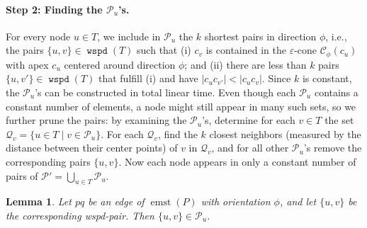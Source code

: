 \documentclass[11pt]{paper}
\newcommand {\eps} {\varepsilon}
\DeclareMathOperator {\wspd}{\texttt{wspd}}
\DeclareMathOperator {\emst}{emst}
\newtheorem {lem}[theorem] {Lemma}
\begin{document}
\paragraph{Step 2: Finding the $\mathcal{P}_u$'s.}
For every node $u \in T$, we include in $\mathcal{P}_u$ the $k$ shortest
pairs in direction $\phi$, i.e., the
pairs $\{u, v\} \in \wspd(T)$ such that
(i) $c_v$ is contained
in the $\eps$-cone $\mathcal{C}_\phi(c_u)$ with apex $c_u$
centered around direction $\phi$;
and (ii) there are less than $k$ pairs $\{u, v'\} \in \wspd(T)$
that fulfill (i) and have
$|c_uc_{v'}| < |c_uc_v|$.
Since $k$ is constant,
the $\mathcal{P}_u$'s can be constructed in total linear
time.
Even though each $\mathcal{P}_u$ contains a constant number of
elements, a node might still appear in many such sets, so
we further prune the pairs:
by examining the $\mathcal{P}_u$'s, determine for each $v \in T$ the
set $\mathcal{Q}_v = \{u \in T \mid v \in \mathcal{P}_u\}$.
For each $\mathcal{Q}_v$, find the $k$ closest neighbors
(measured by the distance between their center points) of $v$ in
$\mathcal{Q}_v$, and for all other $\mathcal{P}_u$'s remove the
corresponding pairs $\{u,v\}$.
Now each node appears in only a constant number of pairs of
$\mathcal{P}' = \bigcup_{u  \in T} \mathcal{P}_u$.

\begin {lem}\label{lem:constant-neighbors}
Let $pq$ be an edge of $\emst(P)$ with orientation $\phi$, and
let $\{u,v\}$ be the corresponding wspd-pair.
Then $\{u,v\} \in \mathcal{P}_u$.
\end {lem}
\end{document}
